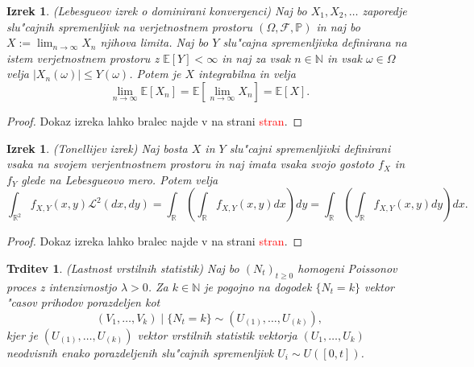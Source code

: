 \documentclass[12pt, a4paper, reqno]{amsart}
\theoremstyle{definition}
\theoremstyle{plain}
\newtheorem{izrek}[definicija]{Izrek}
\newtheorem{trditev}[definicija]{Trditev}
\newcommand{\R}{\mathbb{R}}
\newcommand{\N}{\mathbb{N}}
\newcommand{\E}{\mathbb{E}}
\newcommand{\Prob}{\mathbb{P}}
\newcommand{\1}{\mathds{1}}
\begin{document}
    \begin{izrek}(Lebesgueov izrek o dominirani konvergenci)
        Naj bo $X_1, X_2, \dots $ zaporedje slu"cajnih spremenljivk na verjetnostnem prostoru
        $(\Omega, \mathcal{F}, \Prob)$ in naj bo $X:= \lim_{n\to\infty}X_n$ njihova limita.
        Naj bo $Y$ slu"cajna spremenljivka definirana na istem verjetnostnem prostoru z $\E\left[Y\right]<\infty$ in
        naj za vsak $n\in\N$ in vsak $\omega\in\Omega$ velja $|X_n(\omega)| \leq Y(\omega)$. Potem je $X$ integrabilna
        in velja 
        \begin{equation*}
            \lim_{n\to\infty}\E\left[X_n\right] = \E\left[\lim_{n\to\infty}X_n\right] = \E\left[X\right].
        \end{equation*}
        \label{izr:dominiranaKonvergenca}
    \end{izrek}

    \begin{proof}
        Dokaz izreka lahko bralec najde v \cite{7} na strani \textcolor{red}{stran}.
    \end{proof}

    \begin{izrek}(Tonellijev izrek)
        Naj bosta $X$ in $Y$ slu"cajni spremenljivki definirani vsaka na svojem verjentnostnem prostoru
        in naj imata vsaka svojo gostoto $f_X$ in $f_Y$ glede na Lebesgueovo mero.
        Potem velja
        \begin{equation*}
            \int_{\R^2}f_{X, Y}(x, y)\mathcal{L}^2(dx, dy) 
            = \int_{\R}\left(\int_{\R}f_{X, Y}(x, y)dx\right)dy = \int_{\R}\left(\int_{\R}f_{X, Y}(x, y)dy\right)dx.
        \end{equation*}
        \label{izr:TonellijevIzrek}
    \end{izrek}

    \begin{proof}
        Dokaz izreka lahko bralec najde v \cite{7} na strani \textcolor{red}{stran}.
    \end{proof} 

    \begin{trditev}(Lastnost vrstilnih statistik)
        Naj bo $(N_t)_{t\geq0}$ homogeni Poissonov proces z intenzivnostjo $\lambda > 0$. 
        Za $k\in\N$ je pogojno na dogodek $\{N_t = k\}$ vektor "casov prihodov porazdeljen kot 
        \begin{equation*}
            (V_1, \dots, V_k) \mid \{N_t = k\} \sim (U_{(1)}, \dots, U_{(k)}),
        \end{equation*}
        kjer je $(U_{(1)}, \dots, U_{(k)})$ vektor vrstilnih statistik vektorja $(U_1, \dots, U_k)$ 
        neodvisnih \newline enako porazdeljenih slu"cajnih spremenljivk $U_i\sim U\left([0, t]\right)$.
        \label{trd:VrstilneStatistikeHPP}
    \end{trditev}
\end{document}
